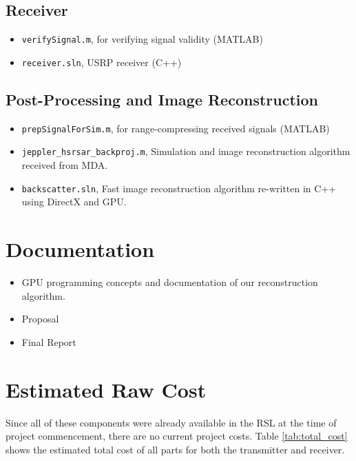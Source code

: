    \subsection{Receiver}
      \begin{itemize}
      \itemsep-1em 
         \item \texttt{verifySignal.m}, for verifying signal validity (MATLAB)
         \item \texttt{receiver.sln}, USRP receiver (C++)
      \end{itemize}
   \subsection{Post-Processing and Image Reconstruction}
      \begin{itemize}
      \itemsep-1em 
         \item \texttt{prepSignalForSim.m}, for range-compressing received signals (MATLAB)
         \item \texttt{jeppler\_hsrsar\_backproj.m}, Simulation and image reconstruction algorithm received from MDA.
         \item \texttt{backscatter.sln}, Fast image reconstruction algorithm re-written in C++ using DirectX and GPU.
      \end{itemize}
\section{Documentation}
   \begin{itemize}
   \itemsep-1em
      \item GPU programming concepts and documentation of our reconstruction algorithm.
      \item Proposal
      \item Final Report
   \end{itemize}
\section{Estimated Raw Cost}
Since all of these components were already available in the RSL at the time of project commencement, there are no current project costs. Table \ref{tab:total_cost} shows the estimated total cost of all parts for both the transmitter and receiver.


